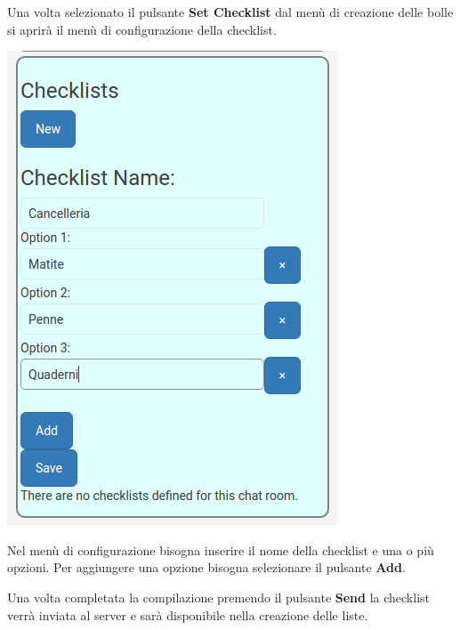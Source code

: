 \begin{flushleft}
Una volta selezionato il pulsante \textbf{Set Checklist} dal menù di creazione delle bolle si aprirà il menù di configurazione della checklist.\\
\begin{center}
\includegraphics[scale=0.75]{img/checklist_conf.png}
\end{center}

Nel menù di configurazione bisogna inserire il nome della checklist e una o più opzioni.
Per aggiungere una opzione bisogna selezionare il pulsante \textbf{Add}.

Una volta completata la compilazione premendo il pulsante \textbf{Send} la checklist verrà inviata al server e sarà disponibile nella creazione delle liste.
\end{flushleft}

